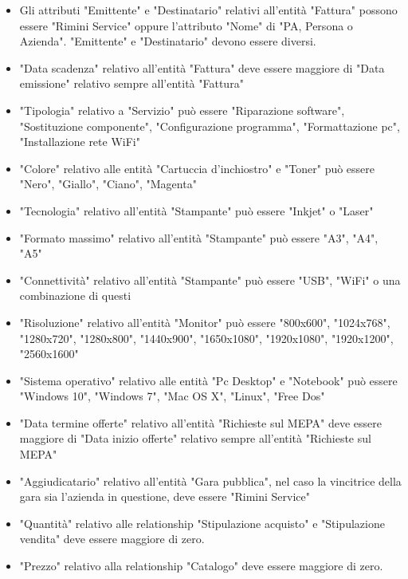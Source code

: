 
\begin{itemize}
\item Gli attributi "Emittente" e "Destinatario" relativi all'entità "Fattura" possono essere "Rimini Service" oppure l'attributo "Nome" di "PA, Persona o Azienda". "Emittente" e "Destinatario" devono essere diversi.
\item "Data scadenza" relativo all'entità "Fattura" deve essere maggiore di "Data emissione" relativo sempre all'entità "Fattura"
\item "Tipologia" relativo a "Servizio" può essere "Riparazione software", "Sostituzione componente", "Configurazione programma", "Formattazione pc", "Installazione rete WiFi"
\item "Colore" relativo alle entità "Cartuccia d'inchiostro" e "Toner" può essere "Nero", "Giallo", "Ciano", "Magenta"
\item "Tecnologia" relativo all'entità "Stampante" può essere "Inkjet" o "Laser"
\item "Formato massimo" relativo all'entità "Stampante" può essere "A3", "A4", "A5"
\item "Connettività" relativo all'entità "Stampante" può essere "USB", "WiFi" o una combinazione di questi
\item "Risoluzione" relativo all'entità "Monitor" può essere "800x600", "1024x768", "1280x720", "1280x800", "1440x900", "1650x1080", "1920x1080", "1920x1200", "2560x1600"
\item "Sistema operativo" relativo alle entità "Pc Desktop" e "Notebook" può essere "Windows 10", "Windows 7", "Mac OS X", "Linux", "Free Dos"
\item "Data termine offerte" relativo all'entità "Richieste sul MEPA" deve essere maggiore di "Data inizio offerte" relativo sempre all'entità "Richieste sul MEPA"
\item "Aggiudicatario" relativo all'entità "Gara pubblica", nel caso la vincitrice della gara sia l'azienda in questione, deve essere "Rimini Service"
\item "Quantità" relativo alle relationship "Stipulazione acquisto" e "Stipulazione vendita" deve essere maggiore di zero.
\item "Prezzo" relativo alla relationship "Catalogo" deve essere maggiore di zero.

\end{itemize}
